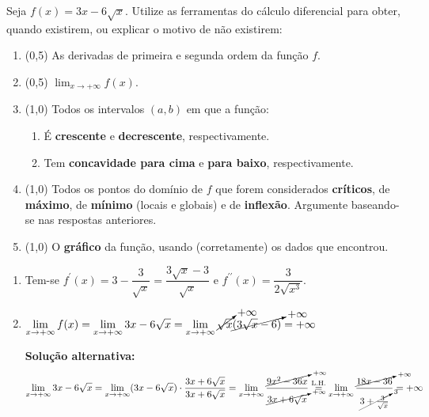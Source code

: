 \documentclass[12pt,a4paper]{article}
\begin{document}
\begin{ExerciseList}
\Exercise[title={4,0}] Seja $f(x) = 3x - 6\sqrt{x}$. Utilize as ferramentas do cálculo diferencial para obter, quando existirem, ou explicar o motivo de não existirem:
\begin{enumerate}
\item (0,5) As derivadas de primeira e segunda ordem da função $f$.
\item (0,5) $\lim_{x \to +\infty} f(x)$.
\item (1,0) Todos os intervalos $(a,b)$ em que a função:
\begin{enumerate}
\item É \textbf{crescente} e \textbf{decrescente}, respectivamente.
\item Tem \textbf{concavidade para cima} e \textbf{para baixo}, respectivamente.
\end{enumerate}
\item (1,0) Todos os pontos do domínio de $f$ que forem considerados \textbf{críticos}, de \textbf{máximo}, de \textbf{mínimo} (locais e globais) e de \textbf{inflexão}. Argumente baseando-se nas respostas anteriores.
\item (1,0) O \textbf{gráfico} da função, usando (corretamente) os dados que encontrou.
\end{enumerate}
\Answer
\begin{enumerate}
\item Tem-se
$f^\prime(x) = 3-\dfrac{3}{\sqrt{x}} = \dfrac{3\sqrt{x}-3}{\sqrt{x}}$
e
$f^{\prime\prime}(x) = \dfrac{3}{2 \sqrt{x^3}}$.
\item  $\displaystyle
\lim_{x \to +\infty} f(x)
= \lim_{x \to +\infty} 3x - 6\sqrt{x}
= \lim_{x \to +\infty} \cancelto{+\infty}{\sqrt{x}}\cancelto{+\infty}{(3\sqrt{x} - 6)}
= +\infty$

\textbf{Solução alternativa:}
\[
\lim_{x \to +\infty} 3x - 6\sqrt{x}
= \lim_{x \to +\infty} (3x - 6\sqrt{x}) \cdot \frac{3x + 6\sqrt{x}}{3x + 6\sqrt{x}}
= \lim_{x \to +\infty} \frac{\cancelto{+\infty}{9x^2 - 36x}}{ \cancelto{+\infty}{3x + 6\sqrt{x}}}
\stackrel{\text{L.H.}}{=}
  \lim_{x \to +\infty} \frac{\cancelto{+\infty}{18x - 36}}{\cancelto{3}{3 + \frac{3}{\sqrt{x}}}}
= +\infty
\]


\end{enumerate}
\end{ExerciseList}
\end{document}
